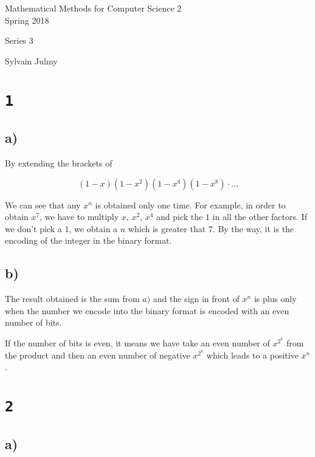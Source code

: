 \documentclass[a4paper,11pt]{report}
\author{Sylvain Julmy}
\date{\today}
\begin{document}
\begin{center}
  \Large{
    Mathematical Methods for Computer Science 2\\
    Spring 2018
  }
  \noindent\makebox[\linewidth]{\rule{\linewidth}{0.4pt}}

  Series 3
  \vspace*{1.4cm}

  Sylvain Julmy
  
  \noindent\makebox[\linewidth]{\rule{\linewidth}{0.4pt}}
\end{center}

\section*{\texttt{1}}

\subsection*{a)}

By extending the brackets of 

\[
  (1-x)(1-x^2)(1-x^4)(1-x^8)\cdot\dots
\]

We can see that any $x^n$ is obtained only one time. For example, in order to
obtain $x^7$, we have to multiply $x$, $x^2$, $x^4$ and pick the $1$ in all the
other factors. If we don't pick a $1$, we obtain a $n$ which is greater that
$7$. By the way, it is the encoding of the integer in the binary format.

\subsection*{b)}

The result obtained is the sum from $a)$ and the sign in front of $x^n$ is plus
only when the number we encode into the binary format is encoded with an even
number of bits.

If the number of bits is even, it means we have take an even number of $x^{2^k}$
from the product and then an even number of negative $x^{2^k}$ which leads to a
positive $x^n$.

\section*{\texttt{2}}

\subsection*{a)}
\end{document}
